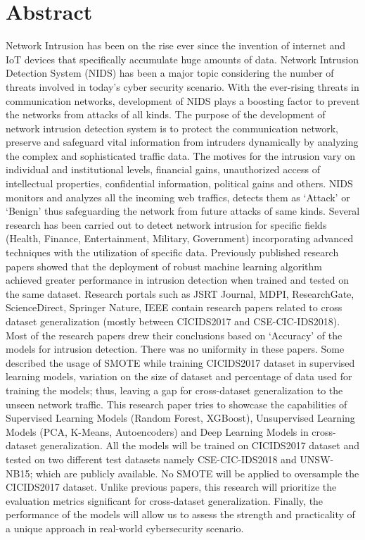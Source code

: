 \chapter*{Abstract} 
	
Network Intrusion has been on the rise ever since the invention of internet and IoT devices that specifically accumulate huge amounts of data. Network Intrusion Detection System (NIDS) has been a major topic considering the number of threats involved in today’s cyber security scenario. With the ever-rising threats in communication networks, development of NIDS plays a boosting factor to prevent the networks from attacks of all kinds. The purpose of the development of network intrusion detection system is to protect the communication network, preserve and safeguard vital information from intruders dynamically by analyzing the complex and sophisticated traffic data. The motives for the intrusion vary on individual and institutional levels, financial gains, unauthorized access of intellectual properties, confidential information, political gains and others. NIDS monitors and analyzes all the incoming web traffics, detects them as ‘Attack’ or ‘Benign’ thus safeguarding the network from future attacks of same kinds. Several research has been carried out to detect network intrusion for specific fields (Health, Finance, Entertainment, Military, Government) incorporating advanced techniques with the utilization of specific data. Previously published research papers showed that the deployment of robust machine learning algorithm achieved greater performance in intrusion detection when trained and tested on the same dataset. Research portals such as JSRT Journal, MDPI, ResearchGate, ScienceDirect, Springer Nature, IEEE contain research papers related to cross dataset generalization (mostly between CICIDS2017 and CSE-CIC-IDS2018). Most of the research papers drew their conclusions based on ‘Accuracy’ of the models for intrusion detection. There was no uniformity in these papers. Some described the usage of SMOTE while training CICIDS2017 dataset in supervised learning models, variation on the size of dataset and percentage of data used for training the models; thus, leaving a gap for cross-dataset generalization to the unseen network traffic. This research paper tries to showcase the capabilities of Supervised Learning Models (Random Forest, XGBoost), Unsupervised Learning Models (PCA, K-Means, Autoencoders) and Deep Learning Models in cross-dataset generalization. All the models will be trained on CICIDS2017 dataset and tested on two different test datasets namely CSE-CIC-IDS2018 and UNSW-NB15; which are publicly available. No SMOTE will be applied to oversample the CICIDS2017 dataset. Unlike previous papers, this research will prioritize the evaluation metrics significant for cross-dataset generalization. Finally, the performance of the models will allow us to assess the strength and practicality of a unique approach in real-world cybersecurity scenario.
